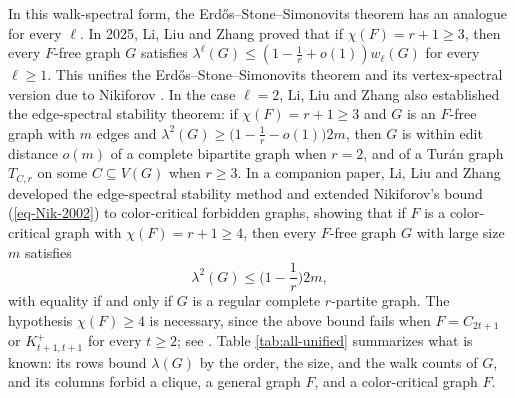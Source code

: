 \documentclass[11pt, a4paper]{article}
\theoremstyle{definition}
\theoremstyle{plain}
\renewcommand{\le}{\leqslant}
\renewcommand{\ge}{\geqslant}
\begin{document}
 \smallskip 
  In this walk-spectral form, the Erd\H{o}s--Stone--Simonovits theorem has an analogue for every $\ell$. In 2025, Li, Liu and Zhang \cite{LLZ-ESS}  
 proved that if $\chi (F)=r+1\ge 3$, then every $F$-free graph $G$ satisfies  $ \lambda^\ell (G)\le \left( 1 \!-\! \frac{1}{r} \!+\! o(1)\right)w_\ell(G)$ for every $\ell \ge 1$.  
This unifies the Erd\H{o}s--Stone--Simonovits theorem and its vertex-spectral version due to  Nikiforov \cite{Nik2009ESB}. 
 In the case $\ell =2$, Li, Liu and Zhang \cite{LLZ-ESS} also established the edge-spectral stability theorem: if $\chi (F)=r+1\ge 3$ and $G$ is an $F$-free graph
with $m$ edges and $\lambda^{2}(G)\ge \bigl(1-\frac1r-o(1)\bigr)2m$, then $G$ is
within edit distance $o(m)$ of a complete bipartite graph when $r=2$, and of a
Tur\'{a}n graph $T_{C,r}$ on some $C\subseteq V(G)$ when $r\ge 3$. 
In a companion paper,  Li, Liu and Zhang \cite{LLZ-Critical} developed the edge-spectral stability method and extended Nikiforov's bound (\ref{eq-Nik-2002}) to color-critical forbidden graphs, showing that if $F$ is a color-critical graph with $\chi (F)=r + 1\ge 4$, then every $F$-free graph $G$ with large size $m$ satisfies 
\begin{equation} \label{eq-LLZ-critical}
  \lambda^2(G)\le \Big( 1- \frac{1}{r} \Big)2m, 
\end{equation} 
with equality if and only if $G$ is a regular complete $r$-partite graph. The hypothesis $\chi (F) \ge 4$ is necessary, since the above bound fails when $F=C_{2t+1}$ or $K_{t+1,t+1}^+$ for every $t\ge 2$; see  \cite{LZS2024,LLZ-Critical}.   
Table \ref{tab:all-unified} summarizes what is known: its rows bound $\lambda (G)$ by the order, the size, and the walk counts of $G$, and its
columns forbid a clique, a general graph $F$, and a color-critical  graph $F$.
\end{document}
